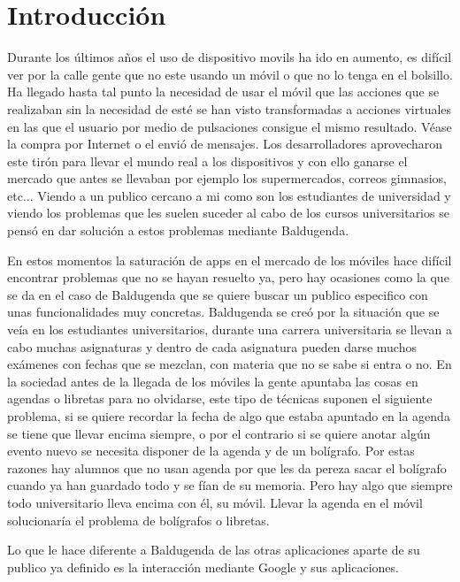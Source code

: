\chapter{Introducción}

Durante los últimos años el uso de \glspl{dispositivo movil} ha ido en aumento, es difícil ver por la calle gente que no este usando un móvil o que no lo tenga en el bolsillo. Ha llegado hasta tal punto la necesidad de usar el móvil que las acciones que se realizaban sin la necesidad de esté se han visto transformadas a acciones virtuales en las que el usuario por medio de pulsaciones consigue el mismo resultado. Véase la compra por Internet o el envió de mensajes.
Los desarrolladores aprovecharon este tirón para llevar el mundo real a los dispositivos y con ello ganarse el mercado que antes se llevaban por ejemplo los supermercados, correos gimnasios, etc...
Viendo a un publico cercano a mi como son los estudiantes de universidad y viendo los problemas que les suelen suceder al cabo de los cursos universitarios se pensó en dar solución a estos problemas mediante Baldugenda.

En estos momentos la saturación de  \acrshort{app}s en el mercado de los móviles hace difícil encontrar problemas que no se hayan resuelto ya, pero hay ocasiones como la que se da en el caso de Baldugenda que se quiere buscar un publico especifico con unas funcionalidades muy concretas. Baldugenda se creó por la situación que se veía en los estudiantes universitarios, durante una carrera universitaria se llevan a cabo muchas asignaturas y dentro de cada asignatura pueden darse muchos exámenes con fechas que se mezclan, con materia que no se sabe si entra o no. En la sociedad antes de la llegada de los móviles la gente apuntaba las cosas en agendas o libretas para no olvidarse, este tipo de técnicas suponen el siguiente problema, si se quiere recordar la fecha de algo que estaba apuntado en la agenda se tiene que llevar encima siempre, o por el contrario si se quiere anotar algún evento nuevo se necesita disponer de la agenda y de un bolígrafo. Por estas razones hay alumnos que no usan agenda por que les da pereza sacar el bolígrafo cuando ya han guardado todo y se fían de su memoria. Pero hay algo que siempre todo universitario lleva encima con él, su móvil. Llevar la agenda en el móvil solucionaría el problema de bolígrafos o libretas. 

Lo que le hace diferente a Baldugenda de las otras aplicaciones aparte de su publico ya definido es la interacción mediante Google y sus aplicaciones.

